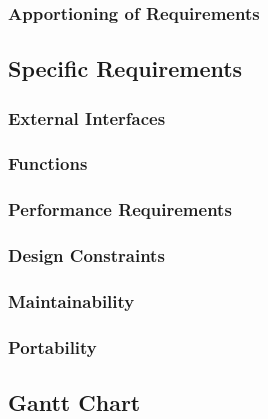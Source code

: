 \subsubsection{Apportioning of Requirements}


\subsection{Specific Requirements}
\subsubsection{External Interfaces}
\subsubsection{Functions}
\subsubsection{Performance Requirements}
\subsubsection{Design Constraints}
\subsubsection{Maintainability}
\subsubsection{Portability}

\subsection{Gantt Chart}
